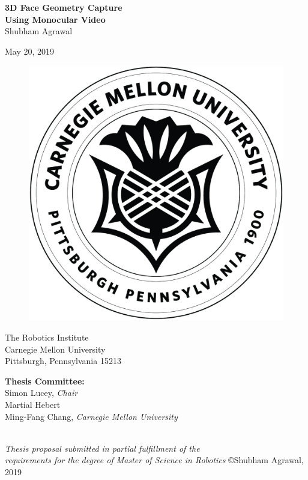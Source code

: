 \thispagestyle{empty}
\date{}

\begin{center}

{\Huge \bf 3D Face Geometry Capture\\ Using Monocular Video } \\
\vspace{1cm}  
{\Large Shubham Agrawal} \\
\vspace{1cm} 


{\Large May 20, 2019} \\
\vspace{1cm}

\begin{figure}[h]
\begin{center}
   \includegraphics[width=0.3\linewidth]{images/CMU_Seal_Carnegie_Mellon_University.jpg}
\end{center}
\label{fig:seal}
\end{figure}

{\Large
The Robotics Institute\\
Carnegie Mellon University\\
Pittsburgh, Pennsylvania 15213\\
}
\vspace{1cm}
{\Large
{\bf Thesis Committee:}\\
Simon Lucey, \textit{Chair} \\
Martial Hebert \\
Ming-Fang Chang, \textit{Carnegie Mellon University}

}
\vspace{1cm}
\par ~ \\
{\large \it Thesis proposal submitted in partial fulfillment of the \\
    requirements for the degree of Master of Science in Robotics}
\vfill
{\large \copyright Shubham Agrawal, 2019}
\end{center}


